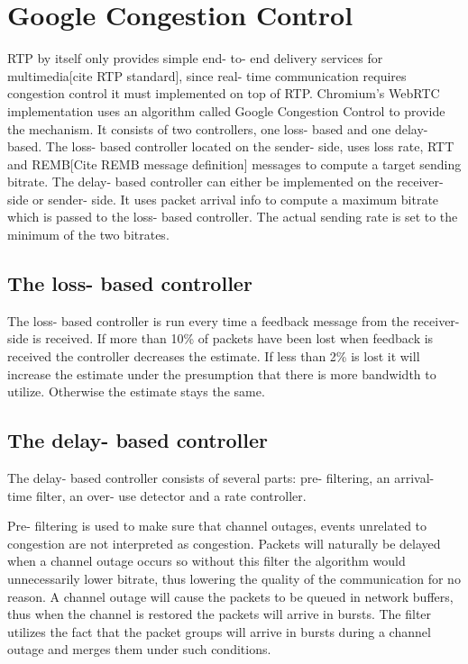 \documentclass[UKenglish]{ifimaster}  %
\begin{document}
\section{Google Congestion Control}
RTP by itself only provides simple end- to- end delivery services for multimedia[cite RTP standard], since real- time communication requires congestion control it must implemented on top of RTP. 
Chromium's WebRTC implementation uses an algorithm called Google Congestion Control \cite{draft-ietf-rmcat-gcc} to provide the mechanism.
It consists of two controllers, one loss- based and one delay- based. 
The loss- based controller located on the sender- side, uses loss rate, RTT and REMB[Cite REMB message definition] messages to compute a target sending bitrate. 
The delay- based controller can either be implemented on the receiver- side or sender- side.
It uses packet arrival info to compute a maximum bitrate which is passed to the loss- based controller. The actual sending rate is set to the minimum of the two bitrates.
\subsection{The loss- based controller}
The loss- based controller is run every time a feedback message from the receiver- side is received. 
If more than 10\% of packets have been lost when feedback is received the controller decreases the estimate. 
If less than 2\% is lost it will increase the estimate under the presumption that there is more bandwidth to utilize. 
Otherwise the estimate stays the same.
\subsection{The delay- based controller}
 The delay- based controller consists of several parts: pre- filtering, an arrival- time filter, an over- use detector and a rate controller. %

 Pre- filtering is used to make sure that channel outages, events unrelated to congestion are not interpreted as congestion.
Packets will naturally be delayed when a channel outage occurs so without this filter the algorithm would unnecessarily lower bitrate, thus lowering the quality of the communication for no reason.
A channel outage will cause the packets to be queued in network buffers, thus when the channel is restored the packets will arrive in bursts. 
The filter utilizes the fact that the packet groups will arrive in bursts during a channel outage and merges them under such conditions.
\end{document}

